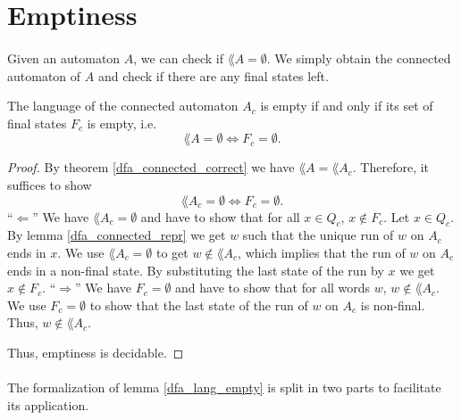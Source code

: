 \section{Emptiness}
\paragraph{}
Given an automaton $A$, we can check if $\lang{A} = \emptyset$. We simply obtain the connected automaton of $A$ and check if there are any final states left. 

\begin{theorem}
    \label{dfa_lang_empty}
    The language of the connected automaton $A_c$ is empty if and only if its set of final states $F_c$ is empty, i.e.
    \begin{equation*}
        \lang{A} = \emptyset \iff F_c = \emptyset.
    \end{equation*}
\end{theorem}

\begin{proof}
    By theorem \ref{dfa_connected_correct} we have $\lang{A} = \lang{A_c}$.
    Therefore, it suffices to show
    \begin{equation*}
        \lang{A_c} = \emptyset \iff F_c = \emptyset.
    \end{equation*}
    ``$\Leftarrow$''
    We have $\lang{A_c} = \emptyset$ and have to show that for all $x \in Q_c$, $x \notin F_c$.
    Let $x \in Q_c$. 
    By lemma \ref{dfa_connected_repr} we get $w$ such that the unique run of $w$ on $A_c$
    ends in $x$. 
    We use $\lang{A_c} = \emptyset$ to get $w \notin \lang{A_c}$, 
    which implies that the run of $w$ on $A_c$ ends in a non-final state.
    By substituting the last state of the run by $x$ we get $x \notin F_c$.
    ``$\Rightarrow$''
    We have $F_c = \emptyset$ and have to show that for all words $w$, $w \notin \lang{A_c}$.
    We use $F_c = \emptyset$ to show that the last state of the run of $w$ on $A_c$ is non-final.
    Thus, $w \notin \lang{A_c}$.

    Thus, emptiness is decidable.
\end{proof}


\paragraph{}
The formalization of lemma \ref{dfa_lang_empty} is split in two parts to facilitate its application. 




